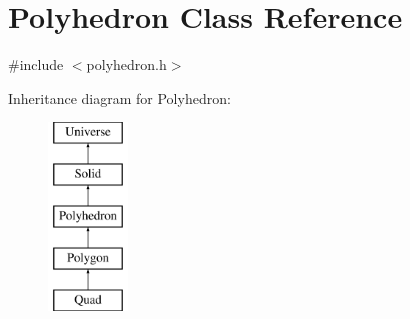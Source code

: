 \hypertarget{classPolyhedron}{}\section{Polyhedron Class Reference}
\label{classPolyhedron}


{\ttfamily \#include $<$polyhedron.\+h$>$}

Inheritance diagram for Polyhedron\+:\begin{figure}[H]
\begin{center}
\leavevmode
\includegraphics[height=5.000000cm]{classPolyhedron}
\end{center}
\end{figure}
